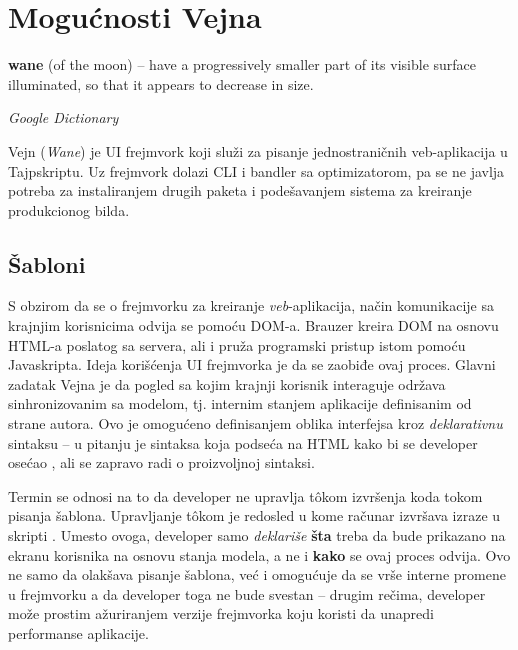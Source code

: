 \chapter{Mogućnosti Vejna}

\epigraph{
  \textbf{wane} (of the moon) -- have a progressively smaller part of its visible surface illuminated, so that it appears to decrease in size.\footnotemark
}{\textsl{Google Dictionary}}


Vejn (\textsl{Wane}) je UI frejmvork koji služi za pisanje jednostraničnih veb-aplikacija u Tajpskriptu.
Uz frejmvork dolazi CLI i bandler sa optimizatorom, pa se ne javlja potreba za instaliranjem drugih paketa i podešavanjem sistema za kreiranje produkcionog bilda.

\section{Šabloni}

S obzirom da se o frejmvorku za kreiranje \emph{veb}-aplikacija, način komunikacije sa krajnjim korisnicima odvija se pomoću DOM-a.
Brauzer kreira DOM na osnovu HTML-a poslatog sa servera, ali i pruža programski pristup istom pomoću Javaskripta.
Ideja korišćenja UI frejmvorka je da se zaobiđe ovaj proces.
Glavni zadatak Vejna je da pogled sa kojim krajnji korisnik interaguje održava sinhronizovanim sa modelom, tj. internim stanjem aplikacije definisanim od strane autora.
Ovo je omogućeno definisanjem oblika interfejsa kroz \emph{deklarativnu} sintaksu -- u pitanju je sintaksa koja podseća na HTML kako bi se developer osećao , ali se zapravo radi o proizvoljnoj sintaksi.

Termin  se odnosi na to da developer ne upravlja t\^okom izvršenja koda tokom pisanja šablona.
Upravljanje tôkom je redosled u kome računar izvršava izraze u skripti \cite{mdn:glossary:control-flow}.
Umesto ovoga, developer samo \emph{deklariše} \textbf{šta} treba da bude prikazano na ekranu korisnika na osnovu stanja modela, a ne i \textbf{kako} se ovaj proces odvija.
Ovo ne samo da olakšava pisanje šablona, već i omogućuje da se vrše interne promene u frejmvorku a da developer toga ne bude svestan -- drugim rečima, developer može prostim ažuriranjem verzije frejmvorka koju koristi da unapredi performanse aplikacije.

